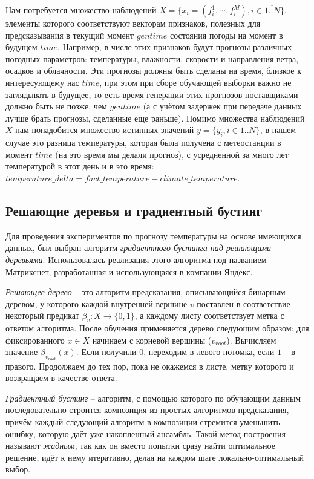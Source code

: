 \documentclass[14pt]{matmex-diploma}
\begin{document}
Нам потребуется множество наблюдений $X = \{x_i = (f^1_{i}, \cdots, f^M_i), i \in \overline{1..N}\}$, элементы которого соответствуют векторам признаков, полезных для предсказывания в текущий момент $gentime$ состояния погоды на момент в будущем $time$. Например, в числе этих признаков будут прогнозы различных погодных параметров: температуры, влажности, скорости и направления ветра, осадков и облачности. Эти прогнозы должны быть сделаны на время, близкое к интересующему нас $time$, при этом при сборе обучающей выборки важно не заглядывать в будущее, то есть время генерации этих прогнозов поставщиками должно быть не позже, чем $gentime$ (а с учётом задержек при передаче данных лучше брать прогнозы, сделанные еще раньше). Помимо множества наблюдений $X$ нам понадобится множество истинных значений $y = \{y_i, i \in \overline{1..N}\}$, в нашем случае это разница температуры, которая была получена с метеостанции в момент $time$ (на это время мы делали прогноз), с усредненной за много лет температурой в этот день и в это время: $temperature\_delta = fact\_temperature - climate\_temperature$.


\subsection{Решающие деревья и градиентный бустинг}

Для проведения экспериментов по прогнозу температуры на основе имеющихся данных, был выбран алгоритм \textit{градиентного бустинга над решающими деревьями}. Использовалась реализация этого алгоритма под названием Матрикснет, разработанная и использующаяся в компании Яндекс.

\textit{Решающее дерево} -- это алгоритм предсказания, описывающийся бинарным деревом, у которого каждой внутренней вершине $v$ поставлен в соответствие некоторый предикат $\beta_v: X \to \{0, 1\}$, а каждому листу соответствует метка с ответом алгоритма\cite{bishop}. После обучения применяется дерево следующим образом: для фиксированного $x \in X$ начинаем с корневой вершины ($v_{root}$). Вычисляем значение $\beta_{v_{root}}(x)$. Если получили $0$, переходим в левого потомка, если $1$ -- в правого. Продолжаем до тех пор, пока не окажемся в листе, метку которого и возвращаем в качестве ответа.


\textit{Градиентный бустинг} -- алгоритм, с помощью которого по обучающим данным последовательно строится композиция из простых алгоритмов предсказания, причём каждый следующий алгоритм в композиции стремится уменьшить ошибку, которую даёт уже накопленный ансамбль. Такой метод построения называют \textit{жадным}, так как он вместо попытки сразу найти оптимальное решение, идёт к нему итеративно, делая на каждом шаге локально-оптимальный выбор\cite{friedman2001greedy}.
\end{document}
